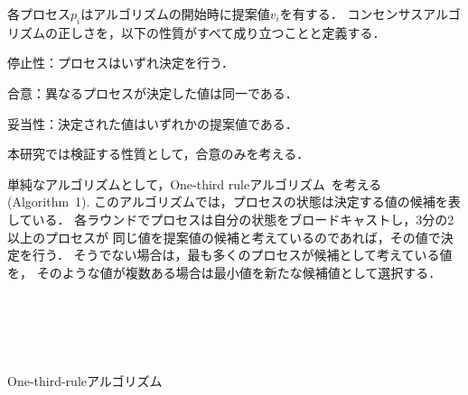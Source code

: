 \documentclass[technicalreport]{ieicej}
\theoremstyle{plain}
\begin{document}
各プロセス$p_i$はアルゴリズムの開始時に提案値$v_i$を有する．
コンセンサスアルゴリズムの正しさを，以下の性質がすべて成り立つことと定義する．

停止性：プロセスはいずれ決定を行う．

合意：異なるプロセスが決定した値は同一である．

妥当性：決定された値はいずれかの提案値である．

本研究では検証する性質として，合意のみを考える．


単純なアルゴリズムとして，One-third ruleアルゴリズム~\cite{HOjournal}を考える(Algorithm~1). 
このアルゴリズムでは，プロセスの状態は決定する値の候補を表している．
各ラウンドでプロセスは自分の状態をブロードキャストし，3分の2以上のプロセスが
同じ値を提案値の候補と考えているのであれば，その値で決定を行う．
そうでない場合は，最も多くのプロセスが候補として考えている値を，
そのような値が複数ある場合は最小値を新たな候補値として選択する．
\begin{algorithm}[ht]
    \normalsize{
        \begin{distribalgo}[1]
           
             \\ 
            \ENDINDENT 
            \BLANK
            
             \\
             \\
{}
\ENDIF
            \ENDIF

            \ENDINDENT
            \caption{One-third-ruleアルゴリズム}
            \label{algo:bakery}
        \end{distribalgo}
    }
\end{algorithm}

\end{document}
